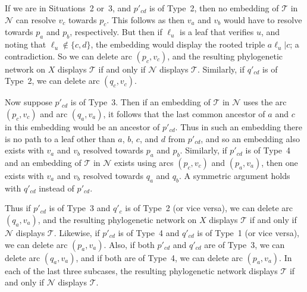 \documentclass[11pt]{amsart}
\begin{document}
If we are in Situations~2 or~3, and $p'_{cd}$ is of Type~2, then no embedding of ${{\mathcal T}}$ in ${{\mathcal N}}$ can resolve $ v_c$ towards $p_c$. This follows as then $v_a$ and $v_b$ would have to resolve towards $p_a$ and $p_b$, respectively. But then if $\ell_u$ is a leaf that verifies $u$, and noting that $\ell_u\not\in \{c, d\}$, the embedding would display the rooted triple $a\ell_u|c$; a contradiction. So we can delete arc $(p_c, v_c)$, and the resulting phylogenetic network on $X$ displays ${{\mathcal T}}$ if and only if ${{\mathcal N}}$ displays ${{\mathcal T}}$. Similarly, if $q'_{cd}$ is of Type~2, we can delete arc $(q_c, v_c)$.

Now suppose $p'_{cd}$ is of Type~3. Then if an embedding of ${{\mathcal T}}$ in ${{\mathcal N}}$ uses the arc $(p_c, v_c)$ and arc $(q_a,v_a)$, it follows that the last common ancestor of $a$ and $c$ in this embedding would be an ancestor of $p'_{cd}$. Thus in such an embedding there is no path to a leaf other than $a$, $b$, $c$, and $d$ from $p'_{cd}$, and so an embedding also exists with $v_a$ and $v_b$ resolved towards $p_a$ and $p_b$. Similarly, if $p'_{cd}$ is of Type~4 and an embedding of ${{\mathcal T}}$ in ${{\mathcal N}}$ exists using arcs $(p_c, v_c)$ and $(p_a, v_a)$, then one exists with $v_a$ and $v_b$ resolved towards $q_a$ and $q_b$. A symmetric argument holds with $q'_{cd}$ instead of $p'_{cd}$.

Thus if $p'_{cd}$ is of Type~3 and $q'_c$ is of Type~2 (or vice versa), we can delete arc $(q_a, v_a)$, and the resulting phylogenetic network on $X$ displays ${{\mathcal T}}$ if and only if ${{\mathcal N}}$ displays ${{\mathcal T}}$. Likewise, if $p'_{cd}$ is of Type~4 and $q'_{cd}$ is of Type~1 (or vice versa), we can delete arc $(p_a,v_a)$. Also, if both $p'_{cd}$ and $q'_{cd}$ are of Type~3, we can delete arc $(q_a, v_a)$, and if both are of Type~4, we can delete arc $(p_a, v_a)$. In each of the last three subcases, the resulting phylogenetic network displays ${{\mathcal T}}$ if and only if ${{\mathcal N}}$ displays ${{\mathcal T}}$.
\end{document}
